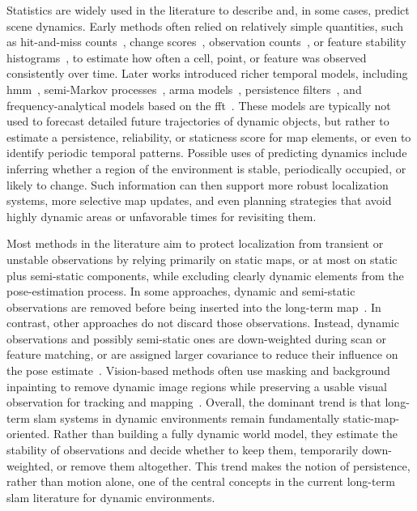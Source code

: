Statistics are widely used in the literature to describe and, in some cases,
predict scene dynamics. Early methods often relied on relatively
simple quantities, such as
hit-and-miss counts~\cite{dayoub:ras:2011},
change scores~\cite{walcott-bryant:iros:2012},
observation counts~\cite{ding:tits:2020,du:tvcg:2022,deng:ram:2023},
or feature stability histograms~\cite{bacca:ras:2013},
to estimate how often a cell, point, or feature was observed
consistently over time. Later works introduced richer temporal models,
including \gls{hmm}~\cite{tipaldi:ijrr:2013},
semi-Markov processes~\cite{rapp:itsc:2015},
\gls{arma} models~\cite{wang:iros:2020,wang:ras:2024},
persistence filters~\cite{deng:ram:2023},
and frequency-analytical models based on the
\gls{fft}~\cite{santos:ral:2016,krajnik:tro:2017}.
These models are typically not used to forecast detailed
future trajectories of dynamic objects, but rather to estimate a persistence,
reliability, or staticness score for map elements, or even to identify
periodic temporal patterns. Possible uses of predicting dynamics
include inferring whether a region of the environment is stable,
periodically occupied, or likely to change. Such information can then support
more robust localization systems, more selective map updates, and even planning
strategies that avoid highly dynamic areas or
unfavorable times for revisiting them.

Most methods in the literature aim to protect localization
from transient or unstable observations by relying primarily on static maps,
or at most on static plus semi-static components, while excluding
clearly dynamic elements from the pose-estimation process. In some approaches,
dynamic and semi-static observations are removed before
being inserted into the long-term
map~\cite{an:as:2016,walcott-bryant:iros:2012,biswas-veloso:ras:2017,lazaro:iros:2018,boniardi:ras:2019,zhang:acc:2019,pan:sensors:2019,ding:tits:2020,thomas:icra:2022,du:tvcg:2022,chen:itsc:2022,wu:cvci:2022,liu:scic:2022,deng:ram:2023,yu:acait:2023,hroob:ras:2024,hroob:ral:2024,jia:tcsvt:2025,wang:tim:2025,zhu:tim:2025}.
In contrast, other approaches
do not discard those observations. Instead, dynamic observations
and possibly semi-static ones are down-weighted during scan or feature matching,
or are assigned larger covariance to reduce their influence
on the pose estimate~\cite{pomerleau:icra:2014,singh:itsc:2021,zhu:icra:2021,soares:jint:2023}.
Vision-based methods often use masking and
background inpainting to remove dynamic image regions while preserving
a usable visual observation for tracking and
mapping~\cite{guo-liu:robio:2021,bescos:ral:2018}.
Overall, the dominant trend is that long-term \gls{slam} systems in dynamic
environments remain fundamentally static-map-oriented. Rather than building
a fully dynamic world model, they estimate the stability of observations
and decide whether to keep them, temporarily down-weighted, or remove them altogether. This trend makes the notion of persistence,
rather than motion alone, one of the central concepts
in the current long-term \gls{slam} literature for dynamic environments.

